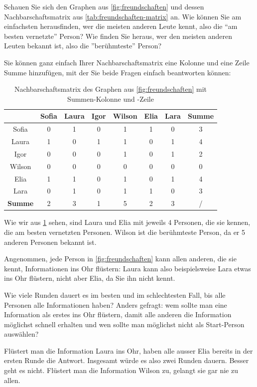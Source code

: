 \begin{myexercise}
Schauen Sie sich den Graphen aus \cref{fig:freundschaften} und dessen Nachbarschaftsmatrix aus \cref{tab:freundschaften-matrix} an. Wie können Sie am einfachsten herausfinden, wer die meisten anderen Leute kennt, also die \enquote{am besten vernetzte} Person? Wie finden Sie heraus, wer den meisten anderen Leuten bekannt ist, also die ''berühmteste'' Person?
\begin{myanswer}
Sie können ganz einfach Ihrer Nachbarschaftsmatrix eine Kolonne und eine Zeile Summe hinzufügen, mit der Sie beide Fragen einfach beantworten können:

\begin{table}[H]
\centering
\begin{tabular}{c||c|c|c|c|c|c||c}
        & Sofia & Laura & Igor & Wilson & Elia & Lara & \textbf{Summe}\\ \midrule
Sofia     & 0 & 1 & 0 & 1 & 1 & 0&3 \\ \hline
Laura & 1 & 0 & 1 & 1 & 0 & 1 &4\\ \hline
Igor     & 0 & 0 & 0 & 1 & 0 & 1&2 \\ \hline
Wilson    & 0 & 0 & 0 & 0 & 0 & 0 & 0\\ \hline
Elia    & 1 & 1 & 0 & 1 & 0 & 1&4 \\ \hline
Lara     & 0 & 1 & 0 & 1 & 1 & 0 &3\\ \midrule\midrule
\textbf{Summe} &2&3&1&5&2&3&/\\
\end{tabular}
\caption{Nachbarschaftsmatrix des Graphen aus \cref{fig:freundschaften} mit Summen-Kolonne und -Zeile}
\label{tab:freundschaften-matrix-sum}
\end{table}
Wie wir aus \cref{tab:freundschaften-matrix-sum} sehen, sind Laura und Elia mit jeweils 4 Personen, die sie kennen, die am besten vernetzten Personen. Wilson ist die berühmteste Person, da er 5 anderen Personen bekannt ist.

\end{myanswer}
\end{myexercise}

\begin{myexercise}
Angenommen, jede Person in \cref{fig:freundschaften} kann allen anderen, die sie kennt, Informationen ins Ohr flüstern: Laura kann also beispielsweise Lara etwas ins Ohr flüstern, nicht aber Elia, da Sie ihn nicht kennt. 

Wie viele Runden dauert es im besten und im schlechtesten Fall, bis alle Personen alle Informationen haben? Anders gefragt: wem sollte man eine Information als erstes ins Ohr flüstern, damit alle anderen die Information möglichst schnell erhalten und wen sollte man möglichst nicht als Start-Person auswählen?

\begin{myanswer}
Flüstert man die Information Laura ins Ohr, haben alle ausser Elia bereits in der ersten Runde die Antwort. Insgesamt würde es also zwei Runden dauern. Besser geht es nicht. Flüstert man die Information Wilson zu, gelangt sie gar nie zu allen.
\end{myanswer}
\end{myexercise}

